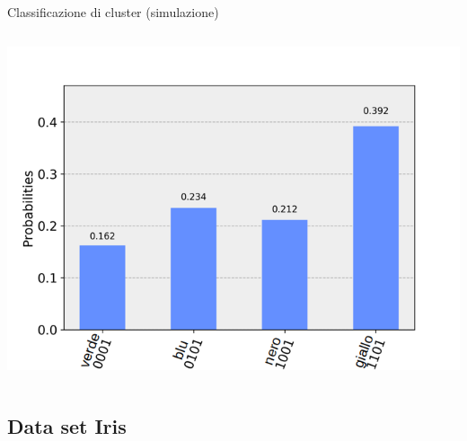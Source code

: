\documentclass{beamer}
\begin{document}
\begin{frame}{Classificazione di cluster (simulazione)}
\begin{columns}
            \includegraphics[width=.9\linewidth]{gfx/Clusters/Simulated/yellow}
        \end{columns}
    \end{frame}

    \subsection{Data set Iris}
\end{document}
